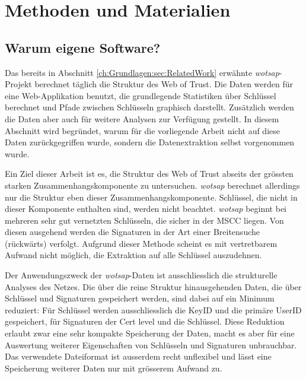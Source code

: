 
\chapter{Methoden und Materialien}
\label{ch:Methoden}

\section{Warum eigene Software?}
\label{ch:Grundlagen:sec:WarumEigene}
Das bereits in Abschnitt \ref{ch:Grundlagen:sec:RelatedWork} erwähnte
\emph{wotsap}-Projekt berechnet täglich die Struktur des Web of
Trust. Die Daten werden für eine Web-Applikation benutzt, die
grundlegende Statistiken über Schlüssel berechnet und Pfade zwischen
Schlüsseln graphisch darstellt. Zusätzlich werden die Daten aber auch
für weitere Analysen zur Verfügung gestellt. In diesem Abschnitt wird
begründet, warum für die vorliegende Arbeit nicht auf diese Daten
zurückgegriffen wurde, sondern die Datenextraktion selbst vorgenommen
wurde.

Ein Ziel dieser Arbeit ist es, die Struktur des Web of Trust abseits
der grössten starken Zusammenhangskomponente zu
untersuchen. \emph{wotsap} berechnet allerdings nur die Struktur eben
dieser Zusammenhangskomponente. Schlüssel, die nicht in dieser
Komponente enthalten sind, werden nicht beachtet. \emph{wotsap}
beginnt bei mehreren sehr gut vernetzten Schlüsseln, die sicher in der
MSCC liegen. Von diesen ausgehend werden die Signaturen in der Art
einer Breitensuche (rückwärts) verfolgt. Aufgrund dieser Methode
scheint es mit vertretbarem Aufwand nicht möglich, die Extraktion auf
alle Schlüssel auszudehnen.

Der Anwendungszweck der \emph{wotsap}-Daten ist ausschliesslich die
strukturelle Analyses des Netzes. Die über die reine Struktur
hinausgehenden Daten, die über Schlüssel und Signaturen gespeichert
werden, sind dabei auf ein Minimum reduziert: Für Schlüssel werden
ausschliesslich die KeyID und die primäre UserID gespeichert, für
Signaturen der Cert level und die Schlüssel. Diese Reduktion erlaubt
zwar eine sehr kompakte Speicherung der Daten, macht es aber für eine
Auswertung weiterer Eigenschaften von Schlüsseln und Signaturen
unbrauchbar. Das verwendete Dateiformat ist ausserdem recht unflexibel
und lässt eine Speicherung weiterer Daten nur mit grösserem Aufwand
zu.

